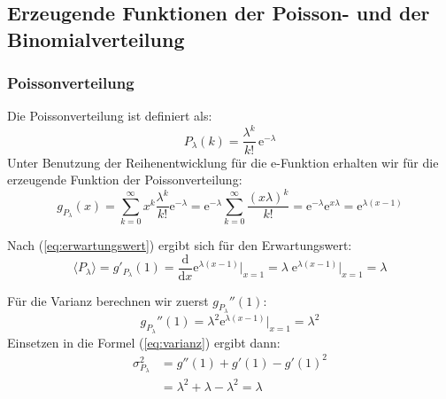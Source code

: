 \documentclass[a4paper]{article}
\newcommand{\dx}{\frac{\mathrm{d}}{\mathrm{d}x}}
\begin{document}
\newpage
\subsection{Erzeugende Funktionen der Poisson- und der Binomialverteilung}
\subsubsection{Poissonverteilung}
Die Poissonverteilung ist definiert als:
\begin{equation}
    P_\lambda (k) = \frac{\lambda^k}{k!}\, \mathrm{e}^{-\lambda}
\end{equation}
Unter Benutzung der Reihenentwicklung für die e-Funktion erhalten wir
für die erzeugende Funktion der Poissonverteilung:
\begin{equation}
    g_{P_\lambda}(x) = \sum_{k=0}^\infty x^k \frac{\lambda^k}{k!} \mathrm{e}^{-\lambda}
                     = \mathrm{e}^{-\lambda} \sum_{k=0}^\infty \frac{(x\lambda)^k}{k!}
                     = \mathrm{e}^{-\lambda} \mathrm{e}^{x\lambda}
                     = \mathrm{e}^{\lambda (x-1)}
\end{equation}

Nach (\ref{eq:erwartungswert}) ergibt sich für den Erwartungswert:
\begin{equation}
    \langle P_\lambda \rangle = g'_{P_\lambda}(1)
    = \dx \mathrm{e}^{\lambda (x-1)} \Big|_{x=1}
    = \lambda \; \mathrm{e}^{\lambda (x-1)} \Big|_{x=1}
    = \lambda
\end{equation}

Für die Varianz berechnen wir zuerst $g_{P_\lambda}''(1)$:
\begin{equation}
    g_{P_\lambda}''(1) = \lambda^2 \mathrm{e}^{\lambda (x-1)} \Big|_{x=1}
                       = \lambda^2
\end{equation}
Einsetzen in die Formel (\ref{eq:varianz}) ergibt dann:
\begin{align*}
    \sigma_{P_\lambda}^2 &= g''(1) + g'(1) - g'(1)^2 \\
                         &= \lambda^2 + \lambda - \lambda^2 = \lambda
\end{align*}
\end{document}
